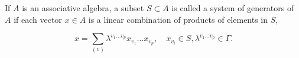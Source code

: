 If $A$ is an associative algebra, a subset $S \subset A$ is called a system of generators of $A$ if each vector $x \in A$ is a linear combination of products of elements in $S$,

$$x = \sum_{(v)} \lambda^{v_1 \dots v_p} x_{v_1} \dots x_{v_p}, \quad x_{v_i} \in S, \lambda^{v_1 \dots v_p} \in \Gamma.$$
